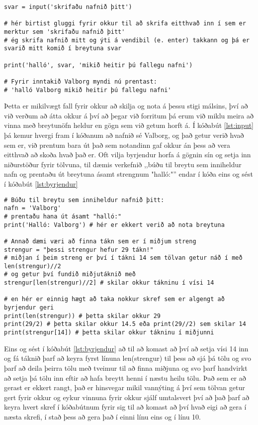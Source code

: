 \begin{lstlisting}[caption=input() fallið notað, label=lst:input]
svar = input('skrifaðu nafnið þitt')

# hér birtist gluggi fyrir okkur til að skrifa eitthvað inn í sem er merktur sem 'skrifaðu nafnið þitt'
# ég skrifa nafnið mitt og ýti á vendibil (e. enter) takkann og þá er svarið mitt komið í breytuna svar

print('halló', svar, 'mikið heitir þú fallegu nafni')

# Fyrir inntakið Valborg myndi nú prentast:
# 'halló Valborg mikið heitir þú fallegu nafni'
\end{lstlisting}

Þetta er mikilvægt fall fyrir okkur að skilja og nota á þessu stigi málsins, því að við verðum að átta okkur á því að þegar við forritum þá erum við miklu meira að vinna með breytunöfn heldur en gögn sem við getum horft á.
Í kóðabút \ref{lst:input} þá kemur hvergi fram í kóðanum að nafnið sé Valborg, og það getur verið hvað sem er, við prentum bara út það sem notandinn gaf okkur án þess að vera eitthvað að skoða hvað það er.
Oft vilja byrjendur horfa á gögnin sín og setja inn niðurstöður fyrir tölvuna, til dæmis verkefnið ,,búðu til breytu sem inniheldur nafn og prentaðu út breytuna ásamt strengnum "halló:"'' endar í kóða eins og sést í kóðabút \ref{lst:byrjendur}

\begin{lstlisting}[caption=Oft forðast byrjendur að nota breytur og treysta meira á að sjá hvað ætti að koma út, label=lst:byrjendur]
# Búðu til breytu sem inniheldur nafnið þitt:
nafn = 'Valborg'
# prentaðu hana út ásamt "halló:"
print('Halló: Valborg') # hér er ekkert verið að nota breytuna

# Annað dæmi væri að finna tákn sem er í miðjum streng
strengur = "þessi strengur hefur 29 tákn!"
# miðjan í þeim streng er því í tákni 14 sem tölvan getur náð í með len(strengur)//2
# og getur því fundið miðjutáknið með 
strengur[len(strengur)//2] # skilar okkur tákninu í vísi 14

# en hér er einnig hægt að taka nokkur skref sem er algengt að byrjendur geri
print(len(strengur)) # þetta skilar okkur 29
print(29/2) # þetta skilar okkur 14.5 eða print(29//2) sem skilar 14
print(strengur[14]) # þetta skilar okkur tákninu í miðjunni

\end{lstlisting}
Eins og sést í kóðabút \ref{lst:byrjendur} að til að komast að því að setja vísi 14 inn og fá táknið þarf að keyra fyrst línuna len(strengur) til þess að sjá þá tölu og svo þarf að deila þeirra tölu með tveimur til að finna miðjuna og svo þarf handvirkt að setja þá tölu inn eftir að hafa breytt henni í næstu heilu tölu.
Það sem er að gerast er ekkert rangt, það er hinsvegar mikil vannýting á því sem tölvan getur gert fyrir okkur og eykur vinnuna fyrir okkur sjálf umtalsvert því að það þarf að keyra hvert skref í kóðabútnum fyrir sig til að komast að því hvað eigi að gera í næsta skrefi, í stað þess að gera það í einni línu eins og í línu 10.
